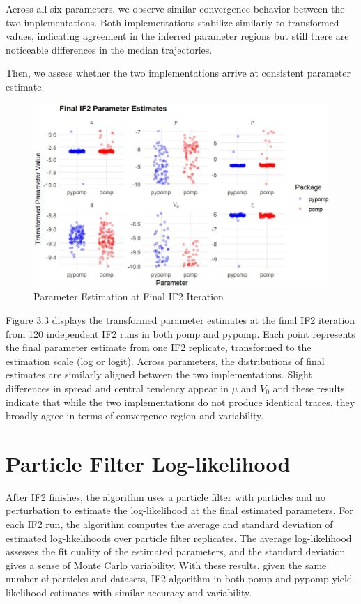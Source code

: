 \documentclass[11pt]{report}
\begin{document}
Across all six parameters, we observe similar convergence behavior between the two implementations. Both implementations stabilize similarly to transformed values, indicating agreement in the inferred parameter regions but still there are noticeable differences in the median trajectories. 

Then, we assess whether the two implementations arrive at consistent parameter estimate.
\begin{figure}[ht]
\begin{center}
\includegraphics[width=\textwidth]{param_final.jpg}
\end{center}
\caption{Parameter Estimation at Final IF2 Iteration}
\label{fig:if2paramtrace2}
\end{figure}

Figure 3.3 displays the transformed parameter estimates at the final IF2 iteration from 120 independent IF2 runs in both pomp and pypomp. Each point represents the final parameter estimate from one IF2 replicate, transformed to the estimation scale (log or logit).
Across parameters, the distributions of final estimates are similarly aligned between the two implementations. Slight differences in spread and central tendency appear in $\mu$ and $V_0$ and these results indicate that while the two implementations do not produce identical traces, they broadly agree in terms of convergence region and variability. 

\section{Particle Filter Log-likelihood}\label{sec:pfilter}
After IF2 finishes, the algorithm uses a particle filter with particles and no perturbation to estimate the log-likelihood at the final estimated parameters. For each IF2 run, the algorithm computes the average and standard deviation of estimated log-likelihoods over particle filter replicates. The average log-likelihood assesses the fit quality of the estimated parameters, and the standard deviation gives a sense of Monte Carlo variability.
With these results, given the same number of particles and datasets, IF2 algorithm in both pomp and pypomp yield likelihood estimates with similar accuracy and variability.
\end{document}
